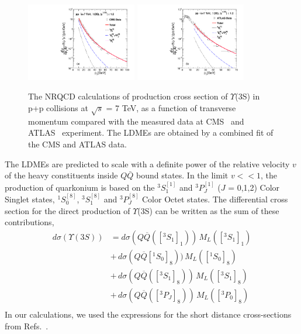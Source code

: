 \documentclass[twocolumn,amsmath,amssymb]{snp}
\begin{document}
\begin{figure}
  \includegraphics[width=0.43\textwidth]{Fig1_Y3S_CMS.pdf}
  \includegraphics[width=0.43\textwidth]{Fig2_Y3S_ATLAS.pdf} 
 \caption{The NRQCD calculations of production cross section of $\Upsilon$(3S) in p+p collisions at 
   $\sqrt{s}$ = 7 TeV, as a function of transverse momentum compared with the measured data 
   at CMS~\cite{Khachatryan:2015qpa} and ATLAS~\cite{Aad:2012dlq} experiment. The LDMEs are obtained by 
   a combined fit of the CMS and ATLAS data.}
  \label{Fig:SigmaY3SCMS}
\end{figure}
The LDMEs are predicted to scale with a definite power of the relative velocity $v$ of the heavy constituents 
inside $Q\bar Q$ bound states. In the limit $v<<1$, the production of quarkonium is based on the $^3S_1^{[1]}$ 
and $^3P_J^{[1]}$ ($J$ = 0,1,2) Color Singlet states, $^1S_0^{[8]}$, $^3S_1^{[8]}$ and $^3P_J^{[8]}$ Color 
Octet states.  The differential cross section for the direct production of $\Upsilon$(3S) can be written as the 
sum of these contributions,
\begin{eqnarray}
d\sigma(\Upsilon(3S)) &= d\sigma(Q\overline{Q}([^3S_1]_{1}))
                   \,M_{L}([^3S_1]_{1}) \nonumber \\
                &+\, d\sigma(Q\overline{Q}[^1S_0]_{8}))
                   \,M_{L}([^1S_0]_{8}) \nonumber \\ 
                &+ \, d\sigma(Q\overline{Q}([^3S_1]_{8}))
                   \,M_{L}([^3S_1]_{8}) \nonumber \\
                &+ \, d\sigma(Q\overline{Q}([^3P_J]_{8}))
                   \,M_{L}([^3P_0]_{8})\nonumber \\ \nonumber
\label{eq:dsigmaJ}
\end{eqnarray}
In our calculations, we used the expressions for the short distance cross-sections 
from Refs.~\cite{Baier:1983va,Cho:1995vh}.
\end{document}
